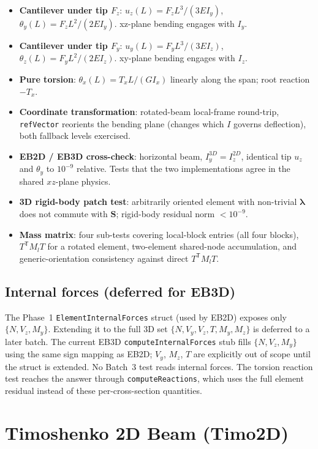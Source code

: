 \documentclass[11pt,a4paper]{book}
\newcommand{\bmath}[1]{\boldsymbol{#1}}
\newcommand{\Sdiag}{\bmath{S}}
\newcommand{\lam}{\bmath{\lambda}}
\begin{document}
\begin{itemize}[leftmargin=*]
    \item \textbf{Cantilever under tip $F_z$}: $u_z(L) = F_z L^3 / (3 E I_y)$, $\theta_y(L) = F_z L^2 / (2 E I_y)$. xz-plane bending engages with $I_y$.
    \item \textbf{Cantilever under tip $F_y$}: $u_y(L) = F_y L^3 / (3 E I_z)$, $\theta_z(L) = F_y L^2 / (2 E I_z)$. xy-plane bending engages with $I_z$.
    \item \textbf{Pure torsion}: $\theta_x(L) = T_x L / (G I_x)$ linearly along the span; root reaction $-T_x$.
    \item \textbf{Coordinate transformation}: rotated-beam local-frame round-trip, \texttt{refVector} reorients the bending plane (changes which $I$ governs deflection), both fallback levels exercised.
    \item \textbf{EB2D / EB3D cross-check}: horizontal beam, $I_y^{3D} = I_z^{2D}$, identical tip $u_z$ and $\theta_y$ to $10^{-9}$ relative. Tests that the two implementations agree in the shared $xz$-plane physics.
    \item \textbf{3D rigid-body patch test}: arbitrarily oriented element with non-trivial $\lam$ does not commute with $\Sdiag$; rigid-body residual norm $< 10^{-9}$.
    \item \textbf{Mass matrix}: four sub-tests covering local-block entries (all four blocks), $T^\mathsf{T} M_l T$ for a rotated element, two-element shared-node accumulation, and generic-orientation consistency against direct $T^\mathsf{T} M_l T$.
\end{itemize}

\section{Internal forces (deferred for EB3D)}

The Phase~1 \texttt{ElementInternalForces} struct (used by EB2D) exposes only $\{N, V_z, M_y\}$. Extending it to the full 3D set $\{N, V_y, V_z, T, M_y, M_z\}$ is deferred to a later batch. The current EB3D \texttt{computeInternalForces} stub fills $\{N, V_z, M_y\}$ using the same sign mapping as EB2D; $V_y$, $M_z$, $T$ are explicitly out of scope until the struct is extended. No Batch~3 test reads internal forces. The torsion reaction test reaches the answer through \texttt{computeReactions}, which uses the full element residual instead of these per-cross-section quantities.

\chapter{Timoshenko 2D Beam (Timo2D)}\label{ch:timo2d}
\end{document}
